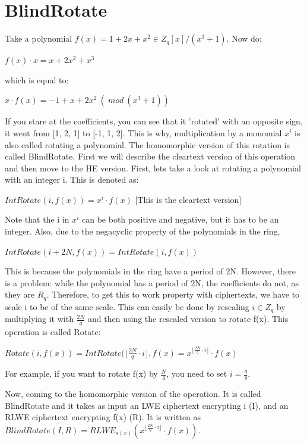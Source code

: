 \documentclass{report}
\begin{document}
\section{BlindRotate}
Take a polynomial $f(x) = 1 + 2x + x^2 \in Z_q[x]/(x^3 + 1)$. Now do:
\begin{center}
	$f(x) \cdot x = x + 2x^2 + x^3$
\end{center}
which is equal to:
\begin{center}
	$x \cdot f(x) = -1 + x + 2x^2 \:(\: mod \: (x^3 + 1))$
\end{center}
If you stare at the coefficients, you can see that it 'rotated' with an opposite sign, it went from [1, 2, 1] to [-1, 1, 2]. This is why, multiplication by a monomial $x^i$ is also called rotating a polynomial. The homomorphic version of this rotation is called BlindRotate. First we will describe the cleartext version of this operation and then move to the HE version. First, lets take a look at rotating a polynomial with an integer i. This is denoted as:
\begin{center}
	$IntRotate(i, f(x)) = x^i \cdot f(x)$ [This is the cleartext version]
\end{center}
Note that the i in $x^i$ can be both positive and negative, but it has to be an integer. Also, due to the negacyclic property of the polynomials in the ring,
\begin{center}
	$IntRotate(i + 2N, f(x)) = IntRotate(i, f(x))$
\end{center}
This is because the polynomials in the ring have a period of 2N. However, there is a problem: while the polynomial has a period of 2N, the coefficients do not, as they are $R_q$. Therefore, to get this to work property with ciphertexts, we have to scale i to be of the same scale. This can easily be done by rescaling $i \in Z_q$ by multiplying it with $\frac{2N}{q}$ and then using the rescaled version to rotate f(x). This operation is called Rotate:
\begin{center}
	$Rotate(i, f(x))= IntRotate(\lfloor \frac{2N}{q} \cdot i \rfloor, f(x) = x^{\lfloor \frac{2N}{q} \cdot i \rfloor} \cdot f(x)$
\end{center}
For example, if you want to rotate f(x) by $\frac{N}{4}$, you need to set $i = \frac{q}{8}$. \newline

Now, coming to the homomorphic version of the operation. It is called BlindRotate and it takes as input an LWE ciphertext encrypting i (I), and an RLWE ciphertext encrypting f(x) (R). It is written as $BlindRotate(I, R) = RLWE_{s(x)}( x^{ \lfloor \frac{2N}{q} \cdot i \rfloor} \cdot f(x))$.\newline
\end{document}
